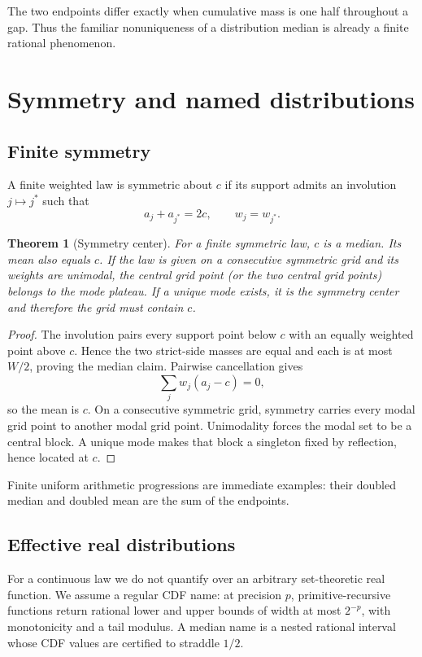 \documentclass[11pt]{article}
\newtheorem{theorem}{Theorem}[section]
\begin{document}
The two endpoints differ exactly when cumulative mass is one half throughout
a gap.  Thus the familiar nonuniqueness of a distribution median is already a
finite rational phenomenon.

\section{Symmetry and named distributions}

\subsection{Finite symmetry}

A finite weighted law is symmetric about $c$ if its support admits an
involution $j\mapsto j^*$ such that
\[
 a_j+a_{j^*}=2c,\qquad w_j=w_{j^*}.
\]

\begin{theorem}[Symmetry center]\label{thm:symmetry}
For a finite symmetric law, $c$ is a median.  Its mean also equals $c$.  If
the law is given on a consecutive symmetric grid and its weights are unimodal,
the central grid point (or the two central grid points) belongs to the mode
plateau.  If a unique mode exists, it is the symmetry center and therefore the
grid must contain $c$.
\end{theorem}

\begin{proof}
The involution pairs every support point below $c$ with an equally weighted
point above $c$.  Hence the two strict-side masses are equal and each is at
most $W/2$, proving the median claim.  Pairwise cancellation gives
\[
 \sum_jw_j(a_j-c)=0,
\]
so the mean is $c$.  On a consecutive symmetric grid, symmetry carries every modal grid point to
another modal grid point.  Unimodality forces the modal set to be a central
block.  A unique mode makes that block a singleton fixed by reflection, hence
located at $c$.
\end{proof}

Finite uniform arithmetic progressions are immediate examples: their doubled
median and doubled mean are the sum of the endpoints.

\subsection{Effective real distributions}

For a continuous law we do not quantify over an arbitrary set-theoretic real
function.  We assume a regular CDF name: at precision $p$, primitive-recursive
functions return rational lower and upper bounds of width at most $2^{-p}$,
with monotonicity and a tail modulus.  A median name is a nested rational
interval whose CDF values are certified to straddle $1/2$.
\end{document}
